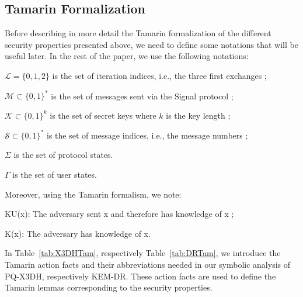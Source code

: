 \subsection{Tamarin Formalization}
\label{sec:tamform}
Before describing in more detail the Tamarin formalization of the different security properties presented above, we need to define some notations that will be useful later. In the rest of the paper, we use the following notations:
\begin{compactitem}
    \item $\mathcal{L} = \{0, 1, 2\}$ is the set of iteration indices, i.e., the three first exchanges ;
    \item $\mathcal{M} \subset \{0,1\}^*$ is the set of messages sent via the Signal protocol ;
    \item $\mathcal{K} \subset \{0,1\}^k$ is the set of secret keys where $k$ is the key length ;
    \item $\mathcal{S} \subset \{0,1\}^*$ is the set of message indices, i.e., the message numbers ;
    \item $\Sigma$ is the set of protocol states.
    \item $\Gamma$ is the set of user states.
\end{compactitem}
Moreover, using the Tamarin formalism, we note:
\begin{compactitem}
    \item KU(x): The adversary sent x and therefore has knowledge of x ;
    \item K(x): The adversary has knowledge of x.
\end{compactitem}

In Table~\ref{tab:X3DHTam}, respectively Table~\ref{tab:DRTam}, we introduce the Tamarin action facts and their abbreviations needed in our symbolic analysis of PQ-X3DH, respectively KEM-DR. These action facts are used to define the Tamarin lemmas corresponding to the security properties.

